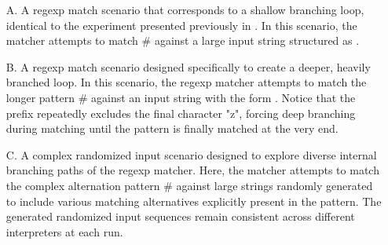     \begin{itemize}
      \item[A.] A regexp match scenario that corresponds to a shallow branching loop, identical to the experiment presented previously in . In this scenario, the matcher attempts to match $\mathtt{\#}$ against a large input string structured as .
      \item[B.] A regexp match scenario designed specifically to create a deeper, heavily branched loop. In this scenario, the regexp matcher attempts to match the longer pattern $\mathtt{\#}$ against an input string with the form . Notice that the prefix repeatedly excludes the final character "z", forcing deep branching during matching until the pattern is finally matched at the very end.
      \item[C.] A complex randomized input scenario designed to explore diverse internal branching paths of the regexp matcher. Here, the matcher attempts to match the complex alternation pattern $\mathtt{\#}$ against large strings randomly generated to include various matching alternatives explicitly present in the pattern. The generated randomized input sequences remain consistent across different interpreters at each run.
    \end{itemize}



